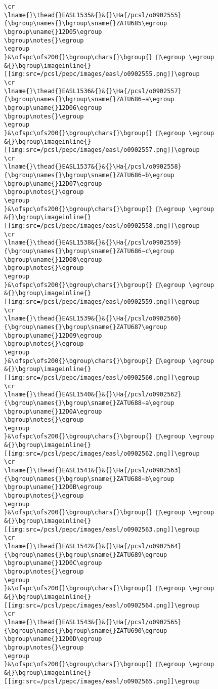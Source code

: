 \begin{verbatim}
\cr
\lname{}\thead{}EASL1535&{}&{}\Ha{/pcsl/o0902555}{\bgroup\names{}\bgroup\sname{}ZATU685\egroup
\bgroup\uname{}12D05\egroup
\bgroup\notes{}\egroup
\egroup
}&\ofspc\ofs200{}\bgroup\chars{}\bgroup{} 𒴅\egroup \egroup
&{}\bgroup\imageinline{}[[img:src=/pcsl/pepc/images/easl/o0902555.png]]\egroup
\cr
\lname{}\thead{}EASL1536&{}&{}\Ha{/pcsl/o0902557}{\bgroup\names{}\bgroup\sname{}ZATU686∼a\egroup
\bgroup\uname{}12D06\egroup
\bgroup\notes{}\egroup
\egroup
}&\ofspc\ofs200{}\bgroup\chars{}\bgroup{} 𒴆\egroup \egroup
&{}\bgroup\imageinline{}[[img:src=/pcsl/pepc/images/easl/o0902557.png]]\egroup
\cr
\lname{}\thead{}EASL1537&{}&{}\Ha{/pcsl/o0902558}{\bgroup\names{}\bgroup\sname{}ZATU686∼b\egroup
\bgroup\uname{}12D07\egroup
\bgroup\notes{}\egroup
\egroup
}&\ofspc\ofs200{}\bgroup\chars{}\bgroup{} 𒴇\egroup \egroup
&{}\bgroup\imageinline{}[[img:src=/pcsl/pepc/images/easl/o0902558.png]]\egroup
\cr
\lname{}\thead{}EASL1538&{}&{}\Ha{/pcsl/o0902559}{\bgroup\names{}\bgroup\sname{}ZATU686∼c\egroup
\bgroup\uname{}12D08\egroup
\bgroup\notes{}\egroup
\egroup
}&\ofspc\ofs200{}\bgroup\chars{}\bgroup{} 𒴈\egroup \egroup
&{}\bgroup\imageinline{}[[img:src=/pcsl/pepc/images/easl/o0902559.png]]\egroup
\cr
\lname{}\thead{}EASL1539&{}&{}\Ha{/pcsl/o0902560}{\bgroup\names{}\bgroup\sname{}ZATU687\egroup
\bgroup\uname{}12D09\egroup
\bgroup\notes{}\egroup
\egroup
}&\ofspc\ofs200{}\bgroup\chars{}\bgroup{} 𒴉\egroup \egroup
&{}\bgroup\imageinline{}[[img:src=/pcsl/pepc/images/easl/o0902560.png]]\egroup
\cr
\lname{}\thead{}EASL1540&{}&{}\Ha{/pcsl/o0902562}{\bgroup\names{}\bgroup\sname{}ZATU688∼a\egroup
\bgroup\uname{}12D0A\egroup
\bgroup\notes{}\egroup
\egroup
}&\ofspc\ofs200{}\bgroup\chars{}\bgroup{} 𒴊\egroup \egroup
&{}\bgroup\imageinline{}[[img:src=/pcsl/pepc/images/easl/o0902562.png]]\egroup
\cr
\lname{}\thead{}EASL1541&{}&{}\Ha{/pcsl/o0902563}{\bgroup\names{}\bgroup\sname{}ZATU688∼b\egroup
\bgroup\uname{}12D0B\egroup
\bgroup\notes{}\egroup
\egroup
}&\ofspc\ofs200{}\bgroup\chars{}\bgroup{} 𒴋\egroup \egroup
&{}\bgroup\imageinline{}[[img:src=/pcsl/pepc/images/easl/o0902563.png]]\egroup
\cr
\lname{}\thead{}EASL1542&{}&{}\Ha{/pcsl/o0902564}{\bgroup\names{}\bgroup\sname{}ZATU689\egroup
\bgroup\uname{}12D0C\egroup
\bgroup\notes{}\egroup
\egroup
}&\ofspc\ofs200{}\bgroup\chars{}\bgroup{} 𒴌\egroup \egroup
&{}\bgroup\imageinline{}[[img:src=/pcsl/pepc/images/easl/o0902564.png]]\egroup
\cr
\lname{}\thead{}EASL1543&{}&{}\Ha{/pcsl/o0902565}{\bgroup\names{}\bgroup\sname{}ZATU690\egroup
\bgroup\uname{}12D0D\egroup
\bgroup\notes{}\egroup
\egroup
}&\ofspc\ofs200{}\bgroup\chars{}\bgroup{} 𒴍\egroup \egroup
&{}\bgroup\imageinline{}[[img:src=/pcsl/pepc/images/easl/o0902565.png]]\egroup

\end{verbatim}

